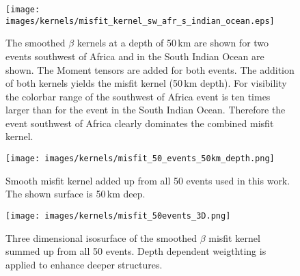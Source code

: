 \begin{figure}[h]
\begin{center}
\texttt{[image: images/kernels/misfit\_kernel\_sw\_afr\_s\_indian\_ocean.eps]}
\caption[Surface of a smooth misfit kernel for two events]
{The smoothed $\beta$ kernels at a depth of 50$\,$km are shown for two events southwest of Africa and 
in the South Indian Ocean are shown. The Moment tensors are added for both events.
The addition of both kernels yields the misfit kernel (50$\,$km depth).
For visibility the colorbar range of the southwest of Africa event is ten times larger than for the event 
in the South Indian Ocean.
Therefore the event southwest of Africa clearly dominates the combined misfit kernel.}  
\label{sw_africa_s_india_msifit_beta_kernel}
\end{center}
\end{figure}



\begin{figure}[h]
\begin{center}
\texttt{[image: images/kernels/misfit\_50\_events\_50km\_depth.png]}
\caption[Smooth misfit kernel for 50 events.]{Smooth misfit kernel added up from
all 50 events used in this work. The shown surface is 50$\,$km deep.}  
\label{misfit_50}
\end{center}
\end{figure}



\begin{figure}[h]
\begin{center}
\texttt{[image: images/kernels/misfit\_50events\_3D.png]}
\caption[3D isosurface of a misfit kernel for 50 events.]{Three dimensional isosurface of the smoothed $\beta$ 
misfit kernel summed up from all 50 events. Depth dependent weigthting is applied to enhance deeper structures.
}  
\label{3d_misfit_50}
\end{center}
\end{figure}
